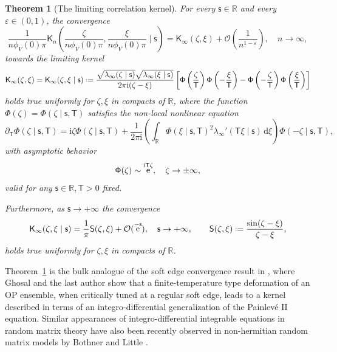\documentclass[reqno,a4paper,11pt]{amsart}
\DeclareMathOperator{\ee}{\rm e}
\newcommand{\R}{\mathbb{R}}
\newcommand{\Boh}{\mathcal{O}}
\newcommand{\ii}{\mathrm{i}}
\newcommand{\dd}{\mathrm{d}}
\newcommand*{\deff}{\mathrel{\vcenter{\baselineskip0.5ex \lineskiplimit0pt
                     \hbox{\scriptsize.}\hbox{\scriptsize.}}}%
                     =}
\newcommand{\msf}{\mathsf}
\newcommand{\Tad}{\msf T}
\newcommand{\sad}{\msf s}
\newtheorem{theorem}{Theorem}[section]
\theoremstyle{definition}
\theoremstyle{remark}
\numberwithin{equation}{section}
\begin{document}
\begin{theorem}[The limiting correlation kernel]\label{thm:CorrelationKernelAsymptotics}
     For every $\sad \in \R$ and every $\varepsilon \in (0,1)$, the convergence
     \begin{equation}\label{eq:convergenceKnintro}
     \frac{1}{n \phi_V(0) \pi} \msf K_n\left( \frac{\zeta}{n \phi_V(0) \pi},\frac{\xi}{ n \phi_V(0) \pi} \mid \sad  \right)=\msf K_\infty(\zeta,\xi)+\Boh \left( \frac{1}{n^{1-\varepsilon}}\right),\quad n\to \infty,
     \end{equation}
towards the limiting kernel
$$
\msf K_\infty(\zeta,\xi)=\msf K_\infty(\zeta,\xi\mid \sad)\deff \frac{\sqrt{\lambda_\infty(\zeta \mid \sad)}\sqrt{\lambda_\infty(\xi\mid \sad )}}{2 \pi \ii (\zeta - \xi)}\left[ \msf \Phi\left(\frac{\zeta}{\msf T}\right)\msf \Phi\left(-\frac{\xi}{\msf T}\right)-\msf \Phi\left(-\frac{\zeta}{\msf T}\right)\msf \Phi\left(\frac{\xi}{\msf T}\right) \right]
$$
%
holds true uniformly for $\zeta,\xi$ in compacts of $\R$, where the function $\msf \Phi(\zeta) = \msf \Phi(\zeta \mid \sad,\msf T)$ satisfies the non-local nonlinear equation
    \begin{equation}\label{eq:PDEPhiintro}
        \partial_{\msf T} \msf \Phi(\zeta \mid \sad, \msf T)=\ii \zeta\msf\Phi(\zeta \mid \sad, \msf T) +\frac{1}{2\pi\ii}
        \left(\int_\R \msf \Phi(\xi \mid \sad, \msf T)^2 \lambda_\infty'( \Tad \xi \mid \sad)\, \dd\xi\right)\msf \Phi(-\zeta \mid \sad, \msf T),
    \end{equation}
    with asymptotic behavior
    \begin{equation}\label{eq:bcPhiintro}
        \msf \Phi(\zeta) \sim \ee^{\ii \msf T\zeta},\quad \zeta \to \pm\infty,
    \end{equation}
    valid for any $\sad\in \R,\msf T>0$ fixed.

Furthermore, as $\sad\to +\infty$ the convergence
%
\begin{equation}\label{eq:sinekernellimit}
\msf K_\infty(\zeta,\xi\mid \sad)=\frac{1}{\pi}\msf S(\zeta,\xi)+\Boh(\ee^{-\sad}),\quad \sad\to +\infty,\qquad \msf S(\zeta,\xi)\deff \frac{\sin(\zeta-\xi)}{\zeta-\xi},
\end{equation}
%
holds true uniformly for $\zeta,\xi$ in compacts of $\R$.
\end{theorem}

Theorem~\ref{thm:CorrelationKernelAsymptotics} is the bulk analogue of the soft edge convergence result in \cite{GhosalSilva22}, where Ghosal and the last author show that a finite-temperature type deformation of an OP ensemble, when critically tuned at a regular soft edge, leads to a kernel described in terms of an integro-differential generalization of the Painlevé II equation. Similar appearances of integro-differential integrable equations in random matrix theory have also been recently observed in non-hermitian random matrix models by Bothner and Little \cite{BothnerLittle24edge, BothnerLittle24bulk}.
\end{document}

